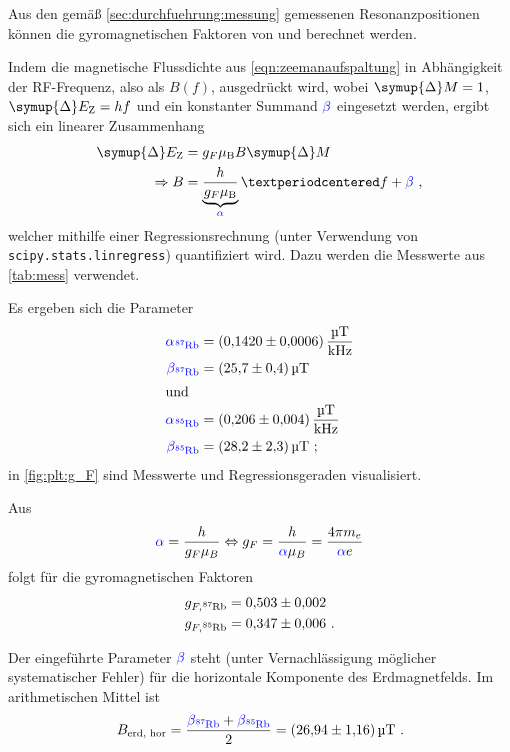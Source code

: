 Aus den gemäß \autoref{sec:durchfuehrung:messung} gemessenen Resonanzpositionen
können die gyromagnetischen Faktoren von  und  berechnet werden.


Indem die magnetische Flussdichte aus \autoref{eqn:zeemanaufspaltung}
in Abhängigkeit der RF-Frequenz, also als $B(f)$, ausgedrückt wird,
wobei $\symup{\Delta} M = 1$, $\symup{\Delta} E_\text{Z} = hf$ und ein konstanter Summand ${\color{blue} \beta}$ eingesetzt werden,
ergibt sich ein linearer Zusammenhang
\begin{align*}
    \symup{\Delta} E_\text{Z} &= g_F \mu_\text{B} B \symup{\Delta} M
    \\
    \Rightarrow
    B &= \underbrace{\frac{h}{g_F \mu_\text{B}}}_{\coloralpha} · f
    + \colorbeta \ ,
\end{align*}
welcher mithilfe einer Regressionsrechnung
(unter Verwendung von \texttt{scipy.stats.linregress})
quantifiziert wird.
Dazu werden die Messwerte aus \autoref{tab:mess} verwendet.

Es ergeben sich die Parameter
\begin{align*}
    {\color{blue} \alpha_{\Rb{87}}} &= \SI{0.1420 \pm 0.0006}{\micro\tesla\per\kilo\hertz} \\
    {\color{blue} \beta_{\Rb{87}}} &= \SI{25.7 \pm 0.4}{\micro\tesla} \\
    \intertext{und}
    {\color{blue} \alpha_{\Rb{85}}} &= \SI{0.206 \pm 0.004}{\micro\tesla\per\kilo\hertz} \\
    {\color{blue} \beta_{\Rb{85}}} &= \SI{28.2 \pm 2.3}{\micro\tesla} \ ;
\end{align*}
in \autoref{fig:plt:g_F} sind Messwerte und Regressionsgeraden visualisiert.

Aus
\[
    {\color{blue} \alpha} = \frac{h}{g_F \mu_B}
    \Leftrightarrow
    g_F = \frac{h}{{\color{blue} \alpha} \mu_B}
    = \frac{4 \pi m_e}{{\color{blue} \alpha} e}
\]
folgt für die gyromagnetischen Faktoren
\begin{align*}
    g_{F, \Rb{87}} &= \num{0.503 \pm 0.002} \\
    g_{F, \Rb{85}} &= \num{0.347 \pm 0.006} \ .
\end{align*}


Der eingeführte Parameter $\color{blue} \beta$ steht
(unter Vernachlässigung möglicher systematischer Fehler)
für die horizontale Komponente des Erdmagnetfelds.
Im arithmetischen Mittel ist
\[
    B_\text{erd, hor}
    = \frac{{\color{blue} \beta_{\Rb{87}}} + \color{blue} \beta_{\Rb{85}}}{2}
    = \SI{26.94 \pm 1.16}{\micro\tesla} \ .
\]

